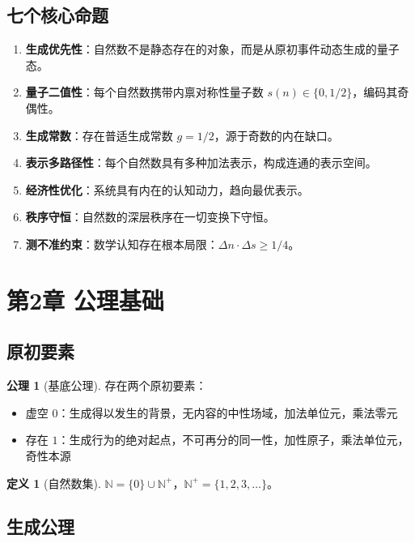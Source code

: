 \documentclass[12pt]{article}
\theoremstyle{definition}
\newtheorem{definition}[theorem]{定义}
\newtheorem{axiom}[theorem]{公理}
\newcommand{\N}{\mathbb{N}}
\begin{document}
\subsection{七个核心命题}

\begin{enumerate}
    \item \textbf{生成优先性}：自然数不是静态存在的对象，而是从原初事件动态生成的量子态。
    \item \textbf{量子二值性}：每个自然数携带内禀对称性量子数 \(s(n) \in \{0, 1/2\}\)，编码其奇偶性。
    \item \textbf{生成常数}：存在普适生成常数 \(g = 1/2\)，源于奇数的内在缺口。
    \item \textbf{表示多路径性}：每个自然数具有多种加法表示，构成连通的表示空间。
    \item \textbf{经济性优化}：系统具有内在的认知动力，趋向最优表示。
    \item \textbf{秩序守恒}：自然数的深层秩序在一切变换下守恒。
    \item \textbf{测不准约束}：数学认知存在根本局限：\(\Delta n \cdot \Delta s \geq 1/4\)。
\end{enumerate}

\section{第2章 公理基础}

\subsection{原初要素}

\begin{axiom}[基底公理]
存在两个原初要素：
\begin{itemize}
    \item 虚空 \(0\)：生成得以发生的背景，无内容的中性场域，加法单位元，乘法零元
    \item 存在 \(1\)：生成行为的绝对起点，不可再分的同一性，加性原子，乘法单位元，奇性本源
\end{itemize}
\end{axiom}

\begin{definition}[自然数集]
\(\N = \{0\} \cup \N^+\)，\(\N^+ = \{1,2,3,\dots\}\)。
\end{definition}

\subsection{生成公理}
\end{document}
